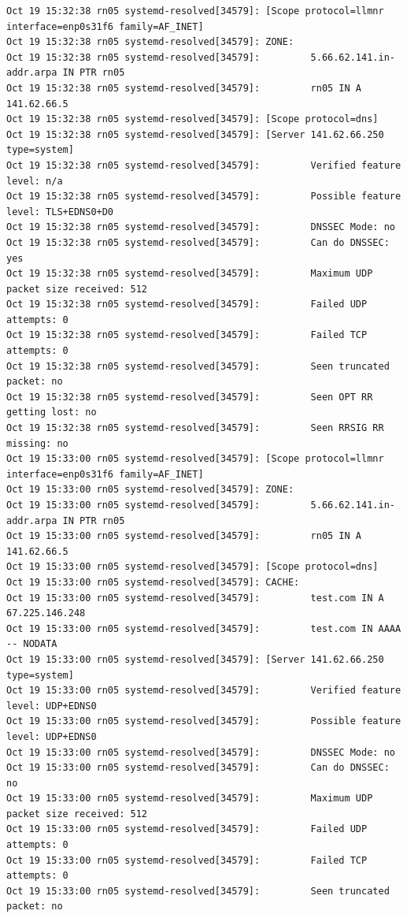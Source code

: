 \begin{verbatim}
Oct 19 15:32:38 rn05 systemd-resolved[34579]: [Scope protocol=llmnr interface=enp0s31f6 family=AF_INET]
Oct 19 15:32:38 rn05 systemd-resolved[34579]: ZONE:
Oct 19 15:32:38 rn05 systemd-resolved[34579]:         5.66.62.141.in-addr.arpa IN PTR rn05
Oct 19 15:32:38 rn05 systemd-resolved[34579]:         rn05 IN A 141.62.66.5
Oct 19 15:32:38 rn05 systemd-resolved[34579]: [Scope protocol=dns]
Oct 19 15:32:38 rn05 systemd-resolved[34579]: [Server 141.62.66.250 type=system]
Oct 19 15:32:38 rn05 systemd-resolved[34579]:         Verified feature level: n/a
Oct 19 15:32:38 rn05 systemd-resolved[34579]:         Possible feature level: TLS+EDNS0+D0
Oct 19 15:32:38 rn05 systemd-resolved[34579]:         DNSSEC Mode: no
Oct 19 15:32:38 rn05 systemd-resolved[34579]:         Can do DNSSEC: yes
Oct 19 15:32:38 rn05 systemd-resolved[34579]:         Maximum UDP packet size received: 512
Oct 19 15:32:38 rn05 systemd-resolved[34579]:         Failed UDP attempts: 0
Oct 19 15:32:38 rn05 systemd-resolved[34579]:         Failed TCP attempts: 0
Oct 19 15:32:38 rn05 systemd-resolved[34579]:         Seen truncated packet: no
Oct 19 15:32:38 rn05 systemd-resolved[34579]:         Seen OPT RR getting lost: no
Oct 19 15:32:38 rn05 systemd-resolved[34579]:         Seen RRSIG RR missing: no
Oct 19 15:33:00 rn05 systemd-resolved[34579]: [Scope protocol=llmnr interface=enp0s31f6 family=AF_INET]
Oct 19 15:33:00 rn05 systemd-resolved[34579]: ZONE:
Oct 19 15:33:00 rn05 systemd-resolved[34579]:         5.66.62.141.in-addr.arpa IN PTR rn05
Oct 19 15:33:00 rn05 systemd-resolved[34579]:         rn05 IN A 141.62.66.5
Oct 19 15:33:00 rn05 systemd-resolved[34579]: [Scope protocol=dns]
Oct 19 15:33:00 rn05 systemd-resolved[34579]: CACHE:
Oct 19 15:33:00 rn05 systemd-resolved[34579]:         test.com IN A 67.225.146.248
Oct 19 15:33:00 rn05 systemd-resolved[34579]:         test.com IN AAAA -- NODATA
Oct 19 15:33:00 rn05 systemd-resolved[34579]: [Server 141.62.66.250 type=system]
Oct 19 15:33:00 rn05 systemd-resolved[34579]:         Verified feature level: UDP+EDNS0
Oct 19 15:33:00 rn05 systemd-resolved[34579]:         Possible feature level: UDP+EDNS0
Oct 19 15:33:00 rn05 systemd-resolved[34579]:         DNSSEC Mode: no
Oct 19 15:33:00 rn05 systemd-resolved[34579]:         Can do DNSSEC: no
Oct 19 15:33:00 rn05 systemd-resolved[34579]:         Maximum UDP packet size received: 512
Oct 19 15:33:00 rn05 systemd-resolved[34579]:         Failed UDP attempts: 0
Oct 19 15:33:00 rn05 systemd-resolved[34579]:         Failed TCP attempts: 0
Oct 19 15:33:00 rn05 systemd-resolved[34579]:         Seen truncated packet: no

\end{verbatim}
